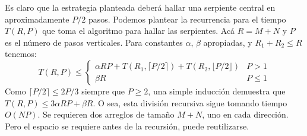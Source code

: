   Es claro que la estrategia planteada deberá hallar una serpiente central
  en aproximadamente \(P/2\) pasos.
  Podemos plantear la recurrencia para el tiempo \(T(R, P)\) que toma
  el algoritmo para hallar las serpientes.
  Acá \(R = M + N\) y \(P\) es el número de pasos verticales.
  Para constantes \(\alpha\), \(\beta\) apropiadas,
  y \(R_1 + R_2 \le R\) tenemos:
  \begin{equation}
    \label{eq:recurrencia-WMMM}
    T(R, P)
      \le \begin{cases}
            \alpha R P
              + T(R_1, \lceil  P / 2 \rceil)
              + T(R_2, \lfloor P / 2 \rfloor) & P >   1 \\
            \beta R			      & P \le 1
          \end{cases}
  \end{equation}
  Como \(\lceil P / 2 \rceil \le 2 P / 3\) siempre que \(P \ge 2\),
  una simple inducción demuestra que
  \(T(R, P) \le 3 \alpha R P + \beta R\).
  O sea,
  esta división recursiva sigue tomando tiempo \(O(N P)\).
  Se requieren dos arreglos de tamaño \(M + N\),
  uno en cada dirección.
  Pero el espacio se requiere antes de la recursión,
  puede reutilizarse.





